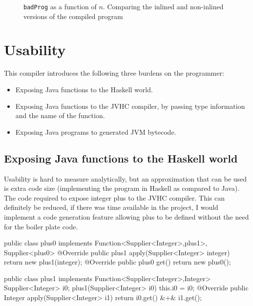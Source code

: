 \documentclass[float=false, crop=false]{standalone}
\newlength\gwidth
\newlength\gheight
\newcommand{\importMGraph}[3]{\setlength{\gwidth}{#2}\setlength{\gheight}{#3}{#1}}
\begin{document}
\begin{figure}
  \centering
  \importMGraph{plotBadInline}{0.96\textwidth}{0.3\textwidth}
  \caption{\texttt{badProg} as a function of $n$. Comparing the inlined and non-inlined
  versions of the compiled program}
    \label{plot:badInline}
\end{figure}

\section{Usability}

This compiler introduces the following three burdens on the programmer:

\begin{itemize}
  \item Exposing Java functions to the Haskell world.

  \item Exposing Java functions to the JVHC compiler, by passing type information and the name 
    of the function.

  \item Exposing Java programs to generated JVM bytecode.
\end{itemize}

\subsection{Exposing Java functions to the Haskell world}

Usability is hard to measure analytically, but an approximation that can be used is extra code size
(implementing the program in Haskell as compared to Java).
The code required to expose integer plus to the JVHC compiler. 
This can definitely be reduced, if there was time available in the project,
I would implement a code generation feature allowing plus to be defined
without the need for the boiler plate code.

\begin{JavaLst}
public class plus0 implements Function<Supplier<Integer>,plus1>, 
                              Supplier<plus0> {
    @Override
    public plus1 apply(Supplier<Integer> integer) 
      { return new plus1(integer); }
    @Override
    public plus0 get() { return new plus0(); }
}

public class plus1 implements Function<Supplier<Integer>,Integer>{
    Supplier<Integer> i0;
    plus1(Supplier<Integer> i0) { this.i0 = i0; }
    @Override
    public Integer apply(Supplier<Integer> i1) 
      { return i0.get() &\textcolor{pgreen}{+}& i1.get(); }
}
\end{JavaLst}
\end{document}
